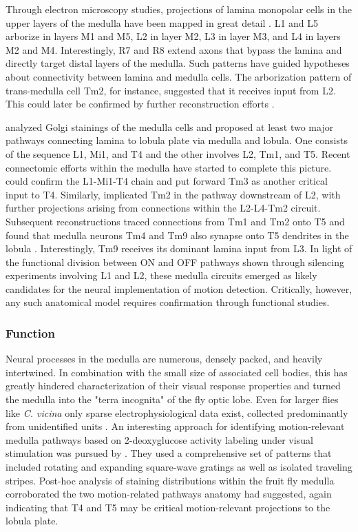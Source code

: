 Through electron microscopy studies, projections of lamina monopolar cells in the upper layers of the medulla have been mapped in great detail \citep{Takemura:2008ee}. L1 and L5 arborize in layers M1 and M5, L2 in layer M2, L3 in layer M3, and L4 in layers M2 and M4. Interestingly, R7 and R8 extend axons that bypass the lamina and directly target distal layers of the medulla. Such patterns have guided hypotheses about connectivity between lamina and medulla cells. The arborization pattern of trans-medulla cell Tm2, for instance, suggested that it receives input from L2. This could later be confirmed by further reconstruction efforts \citep{Takemura:2011iy}.

\citet{Bausenwein:1992vx} analyzed Golgi stainings of the medulla cells and proposed at least two major pathways connecting lamina to lobula plate via medulla and lobula. One consists of the sequence L1, Mi1, and T4 and the other involves L2, Tm1, and T5. Recent connectomic efforts within the medulla have started to complete this picture. \citet{Takemura:2013ea} could confirm the L1-Mi1-T4 chain and put forward Tm3 as another critical input to T4. Similarly, \citet{Takemura:2011iy} implicated Tm2 in the pathway downstream of L2, with further projections arising from connections within the L2-L4-Tm2 circuit. Subsequent reconstructions traced connections from Tm1 and Tm2 onto T5 and found that medulla neurons Tm4 and Tm9 also synapse onto T5 dendrites in the lobula \citep{Shinomiya:2014dx}. Interestingly, Tm9 receives its dominant lamina input from L3. In light of the functional division between ON and OFF pathways shown through silencing experiments involving L1 and L2, these medulla circuits emerged as likely candidates for the neural implementation of motion detection. Critically, however, any such anatomical model requires confirmation through functional studies.

\subsubsection{Function}
Neural processes in the medulla are numerous, densely packed, and heavily intertwined. In combination with the small size of associated cell bodies, this has greatly hindered characterization of their visual response properties and turned the medulla into the "terra incognita" of the fly optic lobe. Even for larger flies like \textit{C. vicina} only sparse electrophysiological data exist, collected predominantly from unidentified units \citep{Mimura:1972aa,DeVoe:1980aa,Douglass:1995aa,Douglass:1996aa}. An interesting approach for identifying motion-relevant medulla pathways based on 2-deoxyglucose activity labeling under visual stimulation was pursued by \citet{Bausenwein:1992aa}. They used a comprehensive set of patterns that included rotating and expanding square-wave gratings as well as isolated traveling stripes. Post-hoc analysis of staining distributions within the fruit fly medulla corroborated the two motion-related pathways anatomy had suggested, again indicating that T4 and T5 may be critical motion-relevant projections to the lobula plate.

